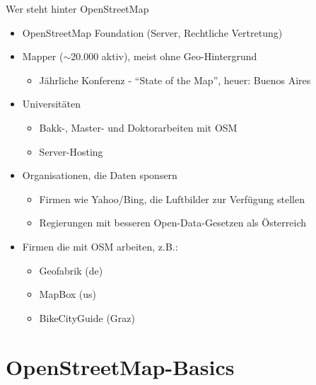 \documentclass{beamer}
\begin{document}
\begin{frame}{Wer steht hinter OpenStreetMap}

  \begin{itemize}
    \item OpenStreetMap Foundation (Server, Rechtliche Vertretung)
      \pause
    \item Mapper ($\sim$20.000 aktiv), meist ohne Geo-Hintergrund
    \begin{itemize}
      \item Jährliche Konferenz - "`State of the Map"', heuer: Buenos Aires
    \end{itemize}
      \pause
    \item Universitäten
    \begin{itemize}
      \item Bakk-, Master- und Doktorarbeiten mit OSM
      \item Server-Hosting
    \end{itemize}
      \pause
    \item Organisationen, die Daten sponsern
    \begin{itemize}
      \item Firmen wie Yahoo/Bing, die Luftbilder zur Verfügung stellen
      \item Regierungen mit besseren Open-Data-Gesetzen als Österreich
    \end{itemize}
      \pause
    \item Firmen die mit OSM arbeiten, z.B.:
    \begin{itemize}
      \item Geofabrik (de)
      \item MapBox (us)
      \item BikeCityGuide (Graz)
    \end{itemize}
  \end{itemize}

\end{frame}

\section{OpenStreetMap-Basics}
\end{document}
